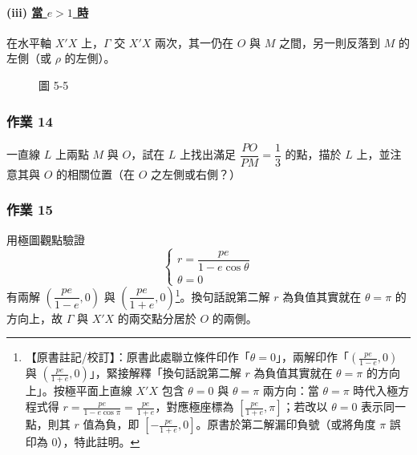 \paragraph*{(iii) \underline{當 $e > 1$ 時}}
在水平軸 $X'X$ 上，$\Gamma$ 交 $X'X$ 兩次，其一仍在 $O$ 與 $M$ 之間，另一則反落到 $M$ 的左側（或 $\rho$ 的左側）。

\begin{figure}[H]
\centering
{}
\caption*{圖 5-5}
\label{fig:b5-5-5}
\end{figure}

\subsubsection*{作業 14}
一直線 $L$ 上兩點 $M$ 與 $O$，試在 $L$ 上找出滿足 $\dfrac{PO}{PM} = \dfrac{1}{3}$ 的點，描於 $L$ 上，並注意其與 $O$ 的相關位置（在 $O$ 之左側或右側？）

\subsubsection*{作業 15}
用極圖觀點驗證
\[
  \begin{cases}
    r = \dfrac{pe}{1 - e\cos\theta} \\[0.6em]
    \theta = 0
  \end{cases}
\]
有兩解 $\left(\dfrac{pe}{1-e}, 0\right)$ 與 $\left(\dfrac{pe}{1+e}, 0\right)$\label{note:b5-ch1-p48-hw15}\footnote{【原書註記/校訂】：原書此處聯立條件印作「$\theta = 0$」，兩解印作「$\left(\frac{pe}{1-e}, 0\right)$ 與 $\left(\frac{pe}{1+e}, 0\right)$」，緊接解釋「換句話說第二解 $r$ 為負值其實就在 $\theta = \pi$ 的方向上」。按極平面上直線 $X'X$ 包含 $\theta = 0$ 與 $\theta = \pi$ 兩方向：當 $\theta = \pi$ 時代入極方程式得 $r = \frac{pe}{1 - e\cos\pi} = \frac{pe}{1+e}$，對應極座標為 $\left[\frac{pe}{1+e}, \pi\right]$；若改以 $\theta = 0$ 表示同一點，則其 $r$ 值為負，即 $\left[-\frac{pe}{1+e}, 0\right]$。原書於第二解漏印負號（或將角度 $\pi$ 誤印為 $0$），特此註明。}。換句話說第二解 $r$ 為負值其實就在 $\theta = \pi$ 的方向上，故 $\Gamma$ 與 $X'X$ 的兩交點分居於 $O$ 的兩側。

